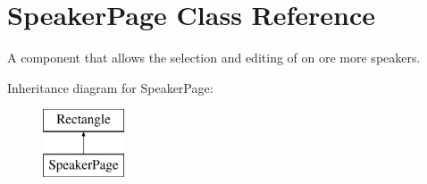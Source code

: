 \hypertarget{classSpeakerPage}{\section{Speaker\-Page Class Reference}
\label{classSpeakerPage}
}


A component that allows the selection and editing of on ore more speakers.  


Inheritance diagram for Speaker\-Page\-:\begin{figure}[H]
\begin{center}
\leavevmode
\includegraphics[height=2.000000cm]{classSpeakerPage}
\end{center}
\end{figure}

